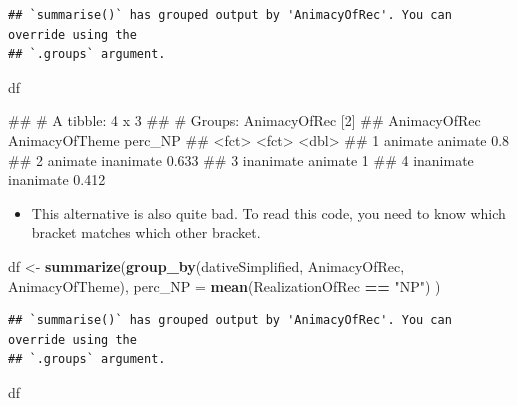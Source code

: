 \documentclass[
]{book}
\newenvironment{Shaded}{\begin{snugshade}}{\end{snugshade}}
\newcommand{\AttributeTok}[1]{\textcolor[rgb]{0.13,0.29,0.53}{#1}}
\newcommand{\FunctionTok}[1]{\textcolor[rgb]{0.13,0.29,0.53}{\textbf{#1}}}
\newcommand{\NormalTok}[1]{#1}
\newcommand{\OtherTok}[1]{\textcolor[rgb]{0.56,0.35,0.01}{#1}}
\newcommand{\SpecialCharTok}[1]{\textcolor[rgb]{0.81,0.36,0.00}{\textbf{#1}}}
\newcommand{\StringTok}[1]{\textcolor[rgb]{0.31,0.60,0.02}{#1}}
\providecommand{\tightlist}{%
  \setlength{\itemsep}{0pt}\setlength{\parskip}{0pt}}
\begin{document}
\begin{verbatim}
## `summarise()` has grouped output by 'AnimacyOfRec'. You can override using the
## `.groups` argument.
\end{verbatim}

\begin{Shaded}
\begin{Highlighting}[]
\NormalTok{df}
\end{Highlighting}
\end{Shaded}

\begin{Shaded}
\begin{Highlighting}[]
\NormalTok{\#\# \# A tibble: 4 x 3}
\NormalTok{\#\# \# Groups:   AnimacyOfRec [2]}
\NormalTok{\#\#   AnimacyOfRec AnimacyOfTheme perc\_NP}
\NormalTok{\#\#   \textless{}fct\textgreater{}        \textless{}fct\textgreater{}            \textless{}dbl\textgreater{}}
\NormalTok{\#\# 1 animate      animate          0.8  }
\NormalTok{\#\# 2 animate      inanimate        0.633}
\NormalTok{\#\# 3 inanimate    animate          1    }
\NormalTok{\#\# 4 inanimate    inanimate        0.412}
\end{Highlighting}
\end{Shaded}

\begin{itemize}
\tightlist
\item
  This alternative is also quite bad. To read this code, you need to know which bracket matches which other bracket.
\end{itemize}

\begin{Shaded}
\begin{Highlighting}[]
\NormalTok{df }\OtherTok{\textless{}{-}} \FunctionTok{summarize}\NormalTok{(}\FunctionTok{group\_by}\NormalTok{(dativeSimplified, AnimacyOfRec, AnimacyOfTheme), }
                  \AttributeTok{perc\_NP =} \FunctionTok{mean}\NormalTok{(RealizationOfRec }\SpecialCharTok{==} \StringTok{"NP"}\NormalTok{) )}
\end{Highlighting}
\end{Shaded}

\begin{verbatim}
## `summarise()` has grouped output by 'AnimacyOfRec'. You can override using the
## `.groups` argument.
\end{verbatim}

\begin{Shaded}
\begin{Highlighting}[]
\NormalTok{df}
\end{Highlighting}
\end{Shaded}
\end{document}
